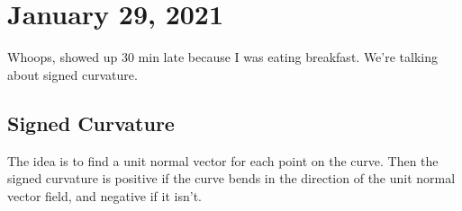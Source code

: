 \section{January 29, 2021}
Whoops, showed up 30 min late because I was eating breakfast. We're talking about signed curvature.
\subsection{Signed Curvature}
The idea is to find a unit normal vector for each point on the curve. Then the signed curvature is positive if the curve bends in the direction of the unit normal vector field, and negative if it isn't.
